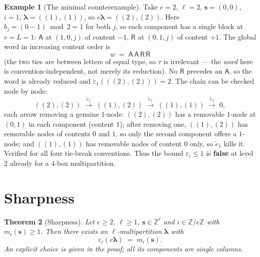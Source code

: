 \documentclass[11pt]{article}
\newtheorem{theorem}{Theorem}
\theoremstyle{definition}
\newtheorem{example}[theorem]{Example}
\newcommand{\ZZ}{\mathbb{Z}}
\newcommand{\ee}{\tilde e}
\newcommand{\eps}{\varepsilon}
\newcommand{\Aa}{{\mathsf A}}
\newcommand{\Rr}{{\mathsf R}}
\newcommand{\bs}{\mathbf{s}}
\newcommand{\blam}{\boldsymbol{\lambda}}
\begin{document}
\begin{example}[The minimal counterexample]\label{ex:min}
Take $e = 2$, $\ell = 2$, $\bs = (0,0)$, $i = 1$,
$\blam = ((1),(1))$, so $e\blam = ((2),(2))$. Here $b_j = (0-1) \bmod 2 = 1$
for both $j$, so each component has a single block at $r = L = 1$:
$\Aa$ at $(1,0,j)$ of content $-1$, $\Rr$ at $(0,1,j)$ of content $+1$.
The global word in increasing content order is
\[
  w \;=\; \Aa\,\Aa\,\Rr\,\Rr
\]
(the two ties are between letters of equal type, so $\tau$ is irrelevant ---
the \emph{word} here is convention-independent, not merely its reduction).
No $\Rr$ precedes an $\Aa$, so the word is already reduced and
$\eps_1(((2),(2))) = 2$. The chain can be checked node by node:
\[
  ((2),(2)) \;\xrightarrow{\ \ee_1\ }\; ((1),(2))
            \;\xrightarrow{\ \ee_1\ }\; ((1),(1))
            \;\xrightarrow{\ \ee_1\ }\; 0 ,
\]
each arrow removing a genuine $1$-node: $((2),(2))$ has a removable $1$-node
at $(0,1)$ in each component (content $1$); after removing one, $((1),(2))$
has removable nodes of contents $0$ and $1$, so only the second component
offers a $1$-node; and $((1),(1))$ has removable nodes of content $0$ only,
so $\ee_1$ kills it. Verified for all four tie-break conventions.
Thus the bound $\eps_i \le 1$ is \textbf{false} at level $2$ already for a
$4$-box multipartition.
\end{example}

\section{Sharpness}\label{sec:sharp}

\begin{theorem}[Sharpness]\label{thm:sharp}
Let $e \ge 2$, $\ell \ge 1$, $\bs \in \ZZ^\ell$ and $i \in \ZZ/e\ZZ$ with
$m_i(\bs) \ge 1$. Then there exists an $\ell$-multipartition $\blam$ with
\[
  \eps_i(e\blam) \;=\; m_i(\bs).
\]
An explicit choice is given in the proof; all its components are single
columns.
\end{theorem}
\end{document}
